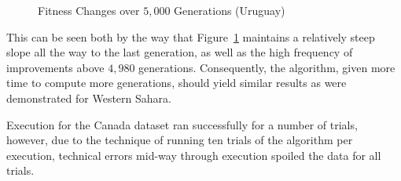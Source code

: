\begin{figure}[h]
	\centering
	\caption{Fitness Changes over $5,000$ Generations (Uruguay)\label{fig:med-fitnesses}}
\end{figure}
This can be seen both by the way that Figure~\ref{fig:med-fitnesses}
maintains a relatively steep slope all the way to the last generation, 
as well as the high frequency of improvements above $4,980$ generations.
Consequently, the algorithm, given more time to compute more generations,
should yield similar results as were demonstrated for Western Sahara.

Execution for the Canada dataset ran successfully for a number of trials,
however, due to the technique of running ten trials of the algorithm per execution,
technical errors mid-way through execution spoiled the data for all trials. 